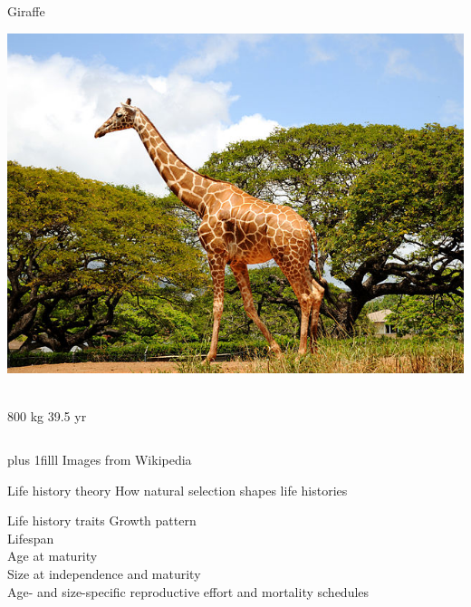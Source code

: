 \documentclass{beamer}
\newcommand{\btVFill}{\vskip0pt plus 1filll}
\begin{document}
\begin{frame}
\begin{columns}[c]
     \begin{block}{Giraffe}
      \begin{center}
        \includegraphics[height=.25\textheight]{640px-Giraffe!_(4565230826).jpg}\
      \end{center}
      800 kg \hfill 39.5 yr
    \end{block}
  \end{columns}

  \btVFill
  \small Images from Wikipedia \normalsize
\end{frame}
\begin{frame}{Life history theory}
How natural selection shapes life histories
\end{frame}

\begin{frame}{Life history traits}
Growth pattern\\
\pause
\vspace{1cm}
Lifespan\\
\pause
\vspace{1cm}
Age at maturity\\
\pause
\vspace{1cm}
Size at independence and maturity\\
\pause
\vspace{1cm}
Age- and size-specific reproductive effort and mortality schedules\\
\end{frame}
\end{document}
